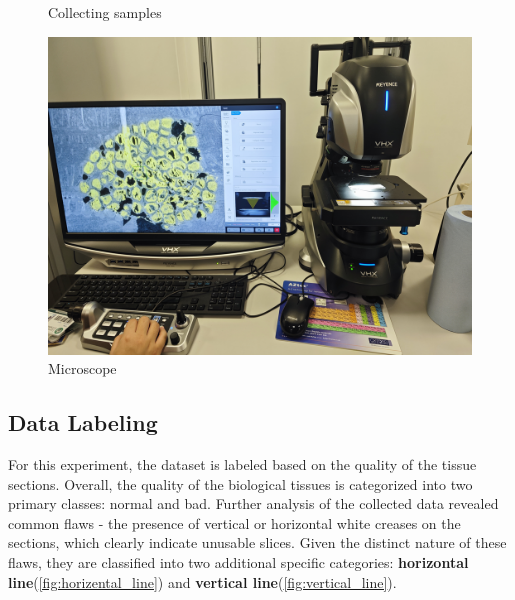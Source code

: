 \begin{figure}[htbp]
\begin{minipage}{0.3\textwidth}
        \caption{Collecting samples}
        \label{fig:采集样本}
    \end{minipage}
    \begin{minipage}{0.35\textwidth}
        \centering
        \includegraphics[width=\textwidth]{./fig/显微镜.jpg}
        \caption{Microscope}
        \label{fig:显微镜}
    \end{minipage}
\end{figure}





\subsection{Data Labeling}

For this experiment, the dataset is labeled based on the quality of the tissue sections. Overall, the quality of the biological tissues is categorized into two primary classes: normal and bad. Further analysis of the collected data revealed common flaws - the presence of vertical or horizontal white creases on the sections, which clearly indicate unusable slices. Given the distinct nature of these flaws, they are classified into two additional specific categories: \textbf{horizontal line}(\autoref{fig:horizental_line}) and \textbf{vertical line}(\autoref{fig:vertical_line}).


